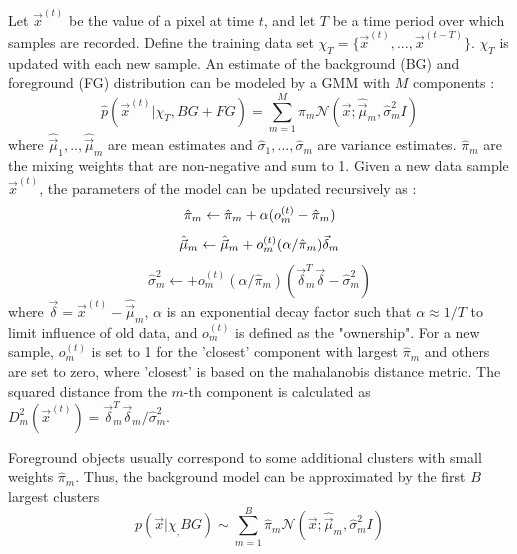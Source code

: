 \documentclass[10pt]{article} %
\begin{document}
Let $\vec{x}^{(t)}$ be the value of a pixel at time $t$, and let $T$ be a time period over which samples are recorded. Define the training data set $\chi_T = \{\vec{x}^{(t)}, ... ,\vec{x}^{(t-T)}\} $. $\chi_T$ is updated with each new sample. An estimate of the background (BG) and foreground (FG) distribution can be modeled by a GMM with $M$ components :
\begin{equation}
\hat{p}(\vec{x}^{(t)} | \chi_T , BG+FG) = \sum_{m=1}^M \hat{\pi}_m \mathcal{N}(\vec{x} ; \hat{\vec{\mu}}_m ,  \hat{\sigma}_m^2 I)
\end{equation}
where $\hat{\vec{\mu}}_1 , .. , \hat{\vec{\mu}}_m$ are mean estimates and $\hat{\sigma}_1 , ... , \hat{\sigma}_m$ are variance estimates. $\hat{\pi}_m$ are the mixing weights that are non-negative and sum to 1. Given a new data sample $\vec{x}^{(t)}$, the parameters of the model can be updated recursively as \cite{zivkovic2}:
\begin{equation}
\hat{\pi}_m \leftarrow \hat{\pi}_m + \alpha ( o_m^{(t)} - \hat{\pi}_m) \\
\end{equation}
\begin{equation}
\hat{\vec{\mu}}_m \leftarrow \hat{\vec{\mu}}_m + o_m^{(t)} (\alpha / \hat{\pi}_m) \vec{\delta}_m \\
\end{equation}
\begin{equation}
\hat{\sigma}_m^2 \leftarrow + o_m^{(t)} (\alpha / \hat{\pi}_m)(  \vec{\delta}_m^T  \vec{\delta} - \hat{\sigma}_m^2)
\end{equation}
where $\vec{\delta} = \vec{x}^{(t)} - \hat{\vec{\mu}}_m$,  $\alpha$ is an exponential decay factor such that $\alpha \approx 1/T$ to limit influence of old data, and $o_m^{(t)}$ is defined as the "ownership". For a new sample, $o_m^{(t)}$ is set to 1 for the 'closest' component with largest $\hat{\pi}_m$ and others are set to zero, where 'closest' is based on the mahalanobis distance metric. The squared distance from the $m$-th component is calculated as $D_m^2 ( \vec{x}^{(t)}) = \vec{\delta}_m^T  \vec{\delta}_m / \hat{\sigma}_m^2$. 

Foreground objects usually correspond to some additional clusters with small weights $\hat{\pi}_m$. Thus, the background model can be approximated by the first $B$ largest clusters
\begin{equation}
p(\vec{x} | \chi_ , BG) \sim \sum_{m=1}^B \hat{\pi}_m \mathcal{N}(\vec{x} ; \hat{\vec{\mu}}_m ,  \hat{\sigma}_m^2 I)
\end{equation}
\end{document}
